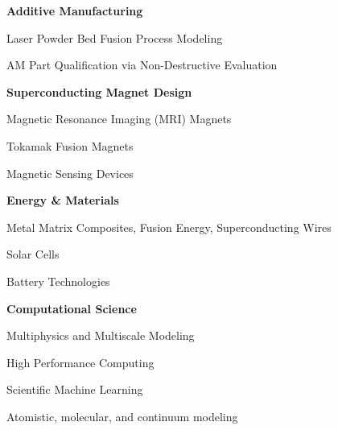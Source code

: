 \documentclass[11pt, letterpaper]{article}
\begin{document}
    \begin{onecolentry}
        \begin{highlightsforbulletentries}
            \item \textbf{Additive Manufacturing}
                \begin{highlightsforbulletentries}
                    \item Laser Powder Bed Fusion Process Modeling
                    \item AM Part Qualification via Non-Destructive Evaluation
                \end{highlightsforbulletentries}
            \item \textbf{Superconducting Magnet Design}
                \begin{highlightsforbulletentries}
                    \item Magnetic Resonance Imaging (MRI) Magnets
                    \item Tokamak Fusion Magnets
                    \item Magnetic Sensing Devices
                \end{highlightsforbulletentries}
            \item \textbf{Energy \& Materials}
                \begin{highlightsforbulletentries}
                    \item Metal Matrix Composites, Fusion Energy, Superconducting Wires
                    \item Solar Cells
                    \item Battery Technologies
                \end{highlightsforbulletentries}
            \item \textbf{Computational Science}
                \begin{highlightsforbulletentries}
                    \item Multiphysics and Multiscale Modeling
                    \item High Performance Computing
                    \item Scientific Machine Learning
                    \item Atomistic, molecular, and continuum modeling
                \end{highlightsforbulletentries}          
        \end{highlightsforbulletentries}
    \end{onecolentry}
    \vspace{0.2 cm}
\end{document}
